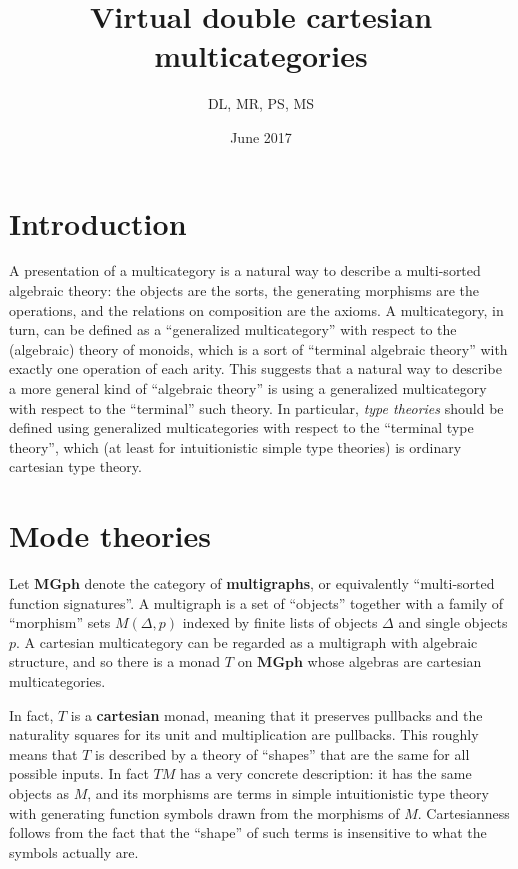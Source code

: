 \documentclass{article}
\title{Virtual double cartesian multicategories}
\author{DL, MR, PS, MS}
\date{June 2017}
\newcommand{\mgph}{\mathbf{MGph}}
\begin{document}
\maketitle

\section{Introduction}

A presentation of a multicategory is a natural way to describe a multi-sorted algebraic theory: the objects are the sorts, the generating morphisms are the operations, and the relations on composition are the axioms.
A multicategory, in turn, can be defined as a ``generalized multicategory'' with respect to the (algebraic) theory of monoids, which is a sort of ``terminal algebraic theory'' with exactly one operation of each arity.
This suggests that a natural way to describe a more general kind of ``algebraic theory'' is using a generalized multicategory with respect to the ``terminal'' such theory.
In particular, \emph{type theories} should be defined using generalized multicategories with respect to the ``terminal type theory'', which (at least for intuitionistic simple type theories) is ordinary cartesian type theory.

\section{Mode theories}

Let $\mgph$ denote the category of \textbf{multigraphs}, or equivalently ``multi-sorted function signatures''.
A multigraph is a set of ``objects'' together with a family of ``morphism'' sets $M(\Delta,p)$ indexed by finite lists of objects $\Delta$ and single objects $p$.
A cartesian multicategory can be regarded as a multigraph with algebraic structure, and so there is a monad $T$ on $\mgph$ whose algebras are cartesian multicategories.

In fact, $T$ is a \textbf{cartesian} monad, meaning that it preserves pullbacks and the naturality squares for its unit and multiplication are pullbacks.
This roughly means that $T$ is described by a theory of ``shapes'' that are the same for all possible inputs.
In fact $T M$ has a very concrete description: it has the same objects as $M$, and its morphisms are terms in simple intuitionistic type theory with generating function symbols drawn from the morphisms of $M$.
Cartesianness follows from the fact that the ``shape'' of such terms is insensitive to what the symbols actually are.
\end{document}
